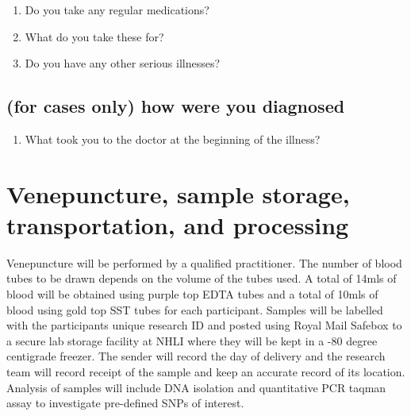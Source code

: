 \documentclass[a4paper,10pt]{article}
\begin{document}
\begin{enumerate}
\item Do you take any regular medications?
\item What do you take these for?
\item Do you have any other serious illnesses?
\end{enumerate}

\subsection{(for cases only) how were you diagnosed}

\begin{enumerate}
\item What took you to the doctor at the beginning of the illness? 
\end{enumerate}

\section{Venepuncture, sample storage, transportation, and processing} 

Venepuncture will be performed by a qualified practitioner. The number of blood tubes to be drawn depends on the volume of the tubes used. A total of 14mls of blood will be obtained using purple top EDTA tubes and a total of 10mls of blood using gold top SST tubes for each participant. Samples will be labelled with the participants unique research ID and posted using Royal Mail Safebox to a secure lab storage facility at NHLI where they will be kept in a -80 degree centigrade freezer.
The sender will record the day of delivery and the research team will record receipt of the sample and keep an accurate record of its location. Analysis of samples will include DNA isolation and quantitative PCR taqman assay to investigate pre-defined SNPs of interest.
\end{document}
